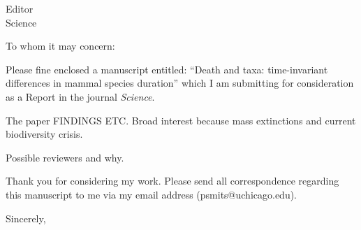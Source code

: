 \documentclass{letter}
\begin{document}
\begin{letter}{Editor \\ Science \\ }
  \opening{To whom it may concern:}
 
  Please fine enclosed a manuscript entitled: ``Death and taxa: time-invariant differences in mammal species duration'' which I am submitting for consideration as a Report in the journal \textit{Science}.

  The paper \uppercase{findings etc.} Broad interest because mass extinctions and current biodiversity crisis.

  Possible reviewers and why.

  Thank you for considering my work. Please send all correspondence regarding this manuscript to me via my email address (psmits@uchicago.edu).

  \closing{Sincerely,}

\end{letter}
\end{document}
